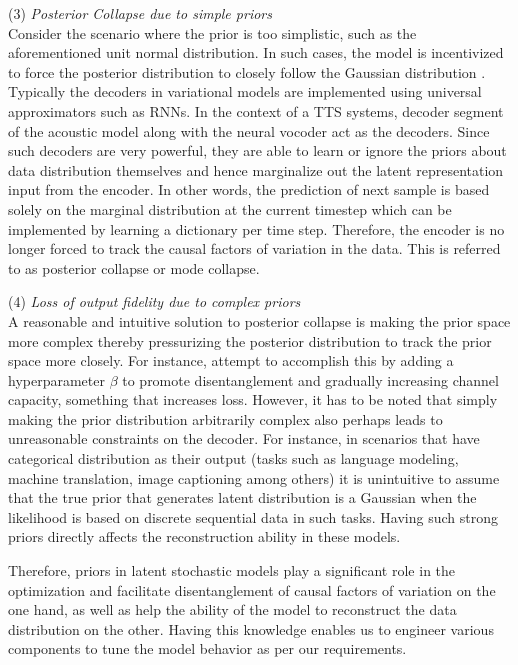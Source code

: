 
(3) \textit{Posterior Collapse due to simple priors} \\
Consider the scenario where the prior is too simplistic, such as the aforementioned unit normal distribution. In such cases, the model is incentivized to force the posterior distribution to closely follow the Gaussian distribution \citep{lossy_vae}. Typically the decoders in variational models are implemented using universal approximators such as RNNs. In the context of a TTS systems, decoder segment of the acoustic model along with the neural vocoder act as the decoders. Since such decoders are very powerful, they are able to learn or ignore the priors about data distribution themselves and hence marginalize out the latent representation input from the encoder. In other words, the prediction of next sample is based solely on the marginal distribution at the current timestep which can be implemented by learning a dictionary per time step. Therefore, the encoder is no longer forced to track the causal factors of variation in the data. This is referred to as posterior collapse or mode collapse. 

(4) \textit{Loss of output fidelity due to complex priors} \\
A reasonable and intuitive solution to posterior collapse is making the prior space more complex thereby pressurizing the posterior distribution to track the prior space more closely. For instance, \citep{beta_analysis} attempt to accomplish this by adding a hyperparameter $\beta$ to promote disentanglement and gradually increasing channel capacity, something that increases loss. However, it has to be noted that simply making the prior distribution arbitrarily complex also perhaps leads to unreasonable constraints on the decoder. For instance, in scenarios that have categorical distribution as their output (tasks such as language modeling, machine translation, image captioning among others) it is unintuitive to assume that the true prior that generates latent distribution is a Gaussian when the likelihood is based on discrete sequential data in such tasks. Having such strong priors directly affects the reconstruction ability in these models.

Therefore, priors in latent stochastic models play a significant role in the optimization and facilitate disentanglement of causal factors of variation on the one hand, as well as help the ability of the model to reconstruct the data distribution on the other. Having this knowledge enables us to engineer various components to tune the model behavior as per our requirements. 


